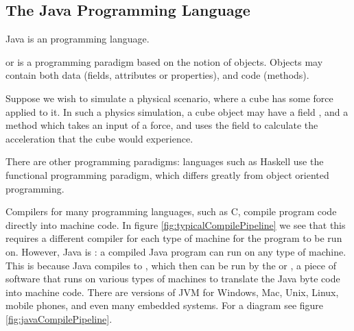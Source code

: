 \documentclass[11pt]{article}
\begin{document}
\subsection{The Java Programming Language}
Java is an  programming language. 
\begin{defi} \label{def:OOP}
     or  is a programming paradigm based on the notion of objects. Objects may contain both data (fields, attributes or properties), and code (methods).
\end{defi}
\begin{eg}
    Suppose we wish to simulate a physical scenario, where a cube has some force applied to it. In such a physics simulation, a cube object may have a field , and a method  which takes an input of a force, and uses the  field to calculate the acceleration that the cube would experience.
\end{eg}
There are other programming paradigms: languages such as Haskell use the functional programming paradigm, which differs greatly from object oriented programming.
\par Compilers for many programming languages, such as C, compile program code directly into machine code. In figure \ref{fig:typicalCompilePipeline} we see that this requires a different compiler for each type of machine for the program to be run on.
However, Java is : a compiled Java program can run on any type of machine. This is because Java compiles to , which then can be run by the  or , a piece of software that runs on various types of machines to translate the Java byte code into machine code. There are versions of JVM for Windows, Mac, Unix, Linux, mobile phones, and even many embedded systems. For a diagram see figure \ref{fig:javaCompilePipeline}.
\end{document}
